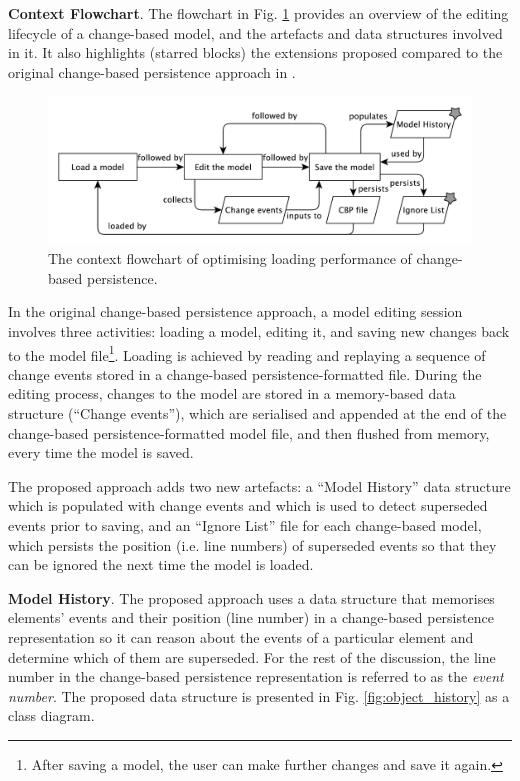 \documentclass[12pt, a4paper]{report} \usepackage[titletoc]{appendix}
\begin{document}
\textbf{Context Flowchart}. The flowchart in Fig. \ref{fig:flowchart} provides an overview of the editing lifecycle of a change-based model, and the artefacts and data structures involved in it. It also highlights (starred blocks) the extensions proposed compared to the original change-based persistence approach in \cite{yohannis2017turning}.

\begin{figure}[ht]
    \centering
    \includegraphics[width=\linewidth]{flowchart}
    \caption{The context flowchart of optimising loading performance of change-based persistence.}
    \label{fig:flowchart}
\end{figure}

In the original change-based persistence approach, a model editing session involves three activities: loading a model, editing it, and saving new changes back to the model file\footnote{After saving a model, the user can make further changes and save it again.}. Loading is achieved by reading and replaying a sequence of change events stored in a change-based persistence-formatted file. During the editing process, changes to the model are stored in a memory-based data structure (``Change events''), which are serialised and appended at the end of the change-based persistence-formatted model file, and then flushed from memory, every time the model is saved.

The proposed approach adds two new artefacts: a ``Model History'' data structure which is populated with change events and which is used to detect superseded events prior to saving, and an ``Ignore List'' file for each change-based model, which persists the position (i.e. line numbers) of superseded events so that they can be ignored the next time the model is loaded.

\textbf{Model History}\label{subsec:model_history}. The proposed approach uses a data structure that memorises elements' events and their position (line number) in a change-based persistence representation so it can reason about the events of a particular element and determine which of them are superseded. For the rest of the discussion, the line number in the change-based persistence representation is referred to as the \emph{event number}. The proposed data structure is presented in Fig. \ref{fig:object_history} as a class diagram.  
\end{document}
